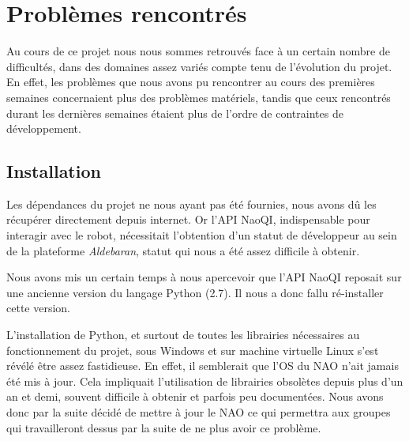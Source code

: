 \section{Problèmes rencontrés}
\label{sec:Problèmes rencontrés}

  \par Au cours de ce projet nous nous sommes retrouvés face à un certain nombre de difficultés, dans des domaines assez variés compte tenu de l'évolution du projet.
  En effet, les problèmes que nous avons pu rencontrer au cours des premières semaines concernaient plus des problèmes matériels, tandis que ceux rencontrés durant les dernières semaines étaient plus de l'ordre de contraintes de développement.

\subsection{Installation}
  \par Les dépendances du projet ne nous ayant pas été fournies, nous avons dû les récupérer directement depuis internet.
  Or l'API NaoQI, indispensable pour interagir avec le robot, nécessitait l'obtention d'un statut de développeur au sein de la plateforme \textit{Aldebaran}, statut qui nous a été assez difficile à obtenir.
  \par Nous avons mis un certain temps à nous apercevoir que l'API NaoQI reposait sur une ancienne version du langage Python (2.7).
  Il nous a donc fallu ré-installer cette version.
  \par L'installation de Python, et surtout de toutes les librairies nécessaires au fonctionnement du projet, sous Windows et sur machine virtuelle Linux s'est révélé être assez fastidieuse.
  En effet, il semblerait que l'OS du NAO n'ait jamais été mis à jour.
  Cela impliquait l’utilisation de librairies obsolètes depuis plus d’un an et demi, souvent difficile à obtenir et parfois peu documentées.
  Nous avons donc par la suite décidé de mettre à jour le NAO ce qui permettra aux groupes qui travailleront dessus par la suite de ne plus avoir ce problème.

